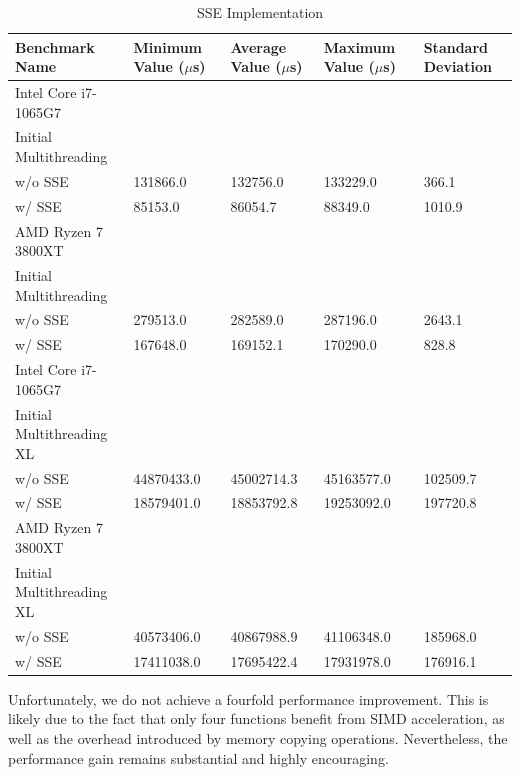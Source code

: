 \documentclass[modern,longauthor]{aastex7}
\begin{document}
\begin{table}[htb!]
\centering
\caption{SSE Implementation\label{tab:sse}}
\begin{tabular}{p{5cm} p{2cm} p{2cm} p{2cm} p{2cm}}
\hline
Benchmark Name & Minimum Value ($\mu$s) & Average Value ($\mu$s) & Maximum Value ($\mu$s) & Standard Deviation \\
\hline
Intel Core i7-1065G7 \\
\hspace{0.5cm}Initial Multithreading \\
\hspace{0.5cm}w/o SSE & 131866.0 & 132756.0 & 133229.0 & 366.1 \\
\hspace{0.5cm}w/ SSE & 85153.0 & 86054.7 & 88349.0 & 1010.9 \\
AMD Ryzen 7 3800XT \\
\hspace{0.5cm}Initial Multithreading \\
\hspace{0.5cm}w/o SSE & 279513.0 & 282589.0 & 287196.0 & 2643.1 \\
\hspace{0.5cm}w/ SSE & 167648.0 & 169152.1 & 170290.0 & 828.8 \\
\hline
Intel Core i7-1065G7 \\
\hspace{0.5cm}Initial Multithreading XL \\
\hspace{0.5cm}w/o SSE & 44870433.0 & 45002714.3 & 45163577.0 & 102509.7 \\
\hspace{0.5cm}w/ SSE & 18579401.0 & 18853792.8 & 19253092.0 & 197720.8 \\
AMD Ryzen 7 3800XT \\
\hspace{0.5cm}Initial Multithreading XL \\
\hspace{0.5cm}w/o SSE & 40573406.0 & 40867988.9 & 41106348.0 & 185968.0 \\
\hspace{0.5cm}w/ SSE & 17411038.0 & 17695422.4 & 17931978.0 & 176916.1 \\
\hline
\end{tabular}
\end{table}
\FloatBarrier

Unfortunately, we do not achieve a fourfold performance improvement. This is likely due to the fact that only four functions benefit from SIMD acceleration, as well as the overhead introduced by memory copying operations. Nevertheless, the performance gain remains substantial and highly encouraging.
\end{document}
